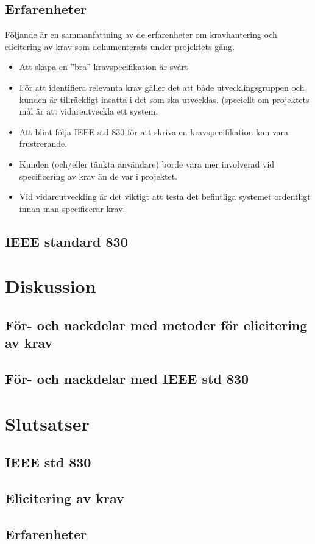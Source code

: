 \subsection{Erfarenheter}
Följande är en sammanfattning av de erfarenheter om kravhantering och elicitering av krav som dokumenterats under projektets gång.
\begin{itemize}
	\item Att skapa en ”bra” kravspecifikation är svårt
	\item För att identifiera relevanta krav gäller det att både utvecklingsgruppen och kunden är tillräckligt insatta i det som ska utvecklas. (speciellt om projektets mål är att vidareutveckla ett system.
	\item Att blint följa IEEE std 830 för att skriva en kravspecifikation kan vara frustrerande.
	\item Kunden (och/eller tänkta användare) borde vara mer involverad vid specificering av krav än de var i projektet.
	\item Vid vidareutveckling är det viktigt att testa det befintliga systemet ordentligt innan man specificerar krav.
\end{itemize}
\subsection{IEEE standard 830}

\section{Diskussion}
\label{sec:discussion-jannering}
\subsection{För- och nackdelar med metoder för elicitering av krav}
\subsection{För- och nackdelar med IEEE std 830}


\section{Slutsatser}
\label{sec:conclusions-jannering}
\subsection{IEEE std 830}
\subsection{Elicitering av krav}
\subsection{Erfarenheter}



